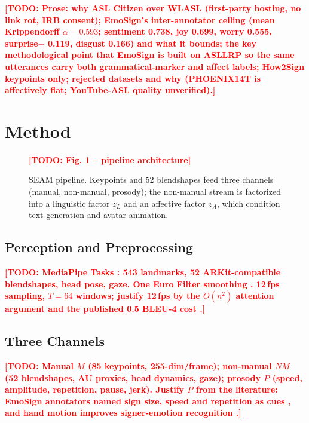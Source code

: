 \documentclass[conference]{IEEEtran}
\newcommand{\TODO}[1]{\textcolor{red}{\textbf{[TODO: #1]}}}
\begin{document}
\TODO{Prose: why ASL Citizen over WLASL (first-party hosting, no link rot, IRB consent);
EmoSign's inter-annotator ceiling (mean Krippendorff $\alpha=0.593$; sentiment 0.738, joy 0.699,
worry 0.555, surprise$-$ 0.119, disgust 0.166) and what it bounds; the key methodological point
that EmoSign is built on ASLLRP so the same utterances carry both grammatical-marker and affect
labels; How2Sign keypoints only; rejected datasets and why (PHOENIX14T is affectively flat;
YouTube-ASL quality unverified).}

\section{Method}
\label{sec:method}

\begin{figure}[t]
\centering
\TODO{Fig. 1 -- pipeline architecture}
\caption{SEAM pipeline. Keypoints and 52 blendshapes feed three channels (manual, non-manual,
prosody); the non-manual stream is factorized into a linguistic factor $z_L$ and an affective
factor $z_A$, which condition text generation and avatar animation.}
\label{fig:pipeline}
\end{figure}

\subsection{Perception and Preprocessing}
\TODO{MediaPipe Tasks \cite{lugaresi2019mediapipe}: 543 landmarks, 52 ARKit-compatible blendshapes,
head pose, gaze. One Euro Filter smoothing \cite{casiez2012oneeuro}. 12\,fps sampling, $T=64$
windows; justify 12\,fps by the $O(n^2)$ attention argument and the published 0.5 BLEU-4 cost
\cite{chen2026compactslt}.}

\subsection{Three Channels}
\TODO{Manual $M$ (85 keypoints, 255-dim/frame); non-manual $NM$ (52 blendshapes, AU proxies, head
dynamics, gaze); prosody $P$ (speed, amplitude, repetition, pause, jerk). Justify $P$ from the
literature: EmoSign annotators named sign size, speed and repetition as cues
\cite{chua2025emosign}, and hand motion improves signer-emotion recognition \cite{ejsl2026}.}
\end{document}
